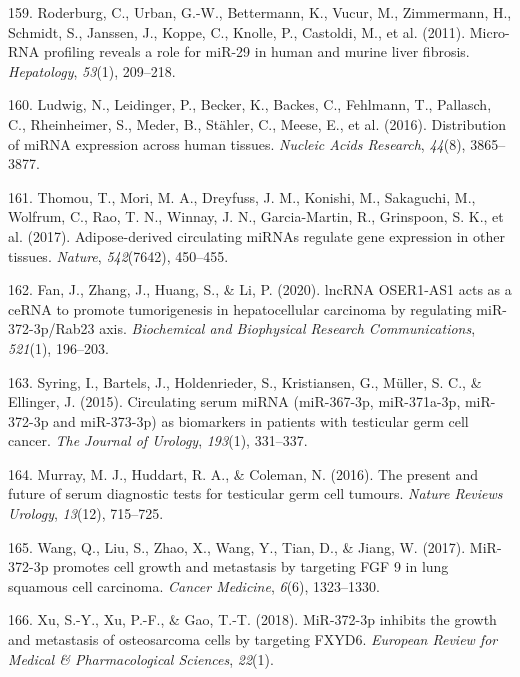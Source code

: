 \documentclass[
  11pt,
  letterpaper,
]{book}
\newlength{\cslhangindent}
\newenvironment{CSLReferences}[2] %
 {\begin{list}{}{%
  \setlength{\itemindent}{0pt}
  \setlength{\leftmargin}{0pt}
  \setlength{\parsep}{0pt}
  \ifodd #1
   \setlength{\leftmargin}{\cslhangindent}
   \setlength{\itemindent}{-1\cslhangindent}
  \fi
  \setlength{\itemsep}{#2\baselineskip}}}
 {\end{list}}
\begin{document}
\begin{CSLReferences}{1}{0}
159. Roderburg, C., Urban, G.-W., Bettermann, K., Vucur, M., Zimmermann,
H., Schmidt, S., Janssen, J., Koppe, C., Knolle, P., Castoldi, M., et
al. (2011). Micro-RNA profiling reveals a role for miR-29 in human and
murine liver fibrosis. \emph{Hepatology}, \emph{53}(1), 209--218.

160. Ludwig, N., Leidinger, P., Becker, K., Backes, C., Fehlmann, T.,
Pallasch, C., Rheinheimer, S., Meder, B., Stähler, C., Meese, E., et al.
(2016). Distribution of miRNA expression across human tissues.
\emph{Nucleic Acids Research}, \emph{44}(8), 3865--3877.

161. Thomou, T., Mori, M. A., Dreyfuss, J. M., Konishi, M., Sakaguchi,
M., Wolfrum, C., Rao, T. N., Winnay, J. N., Garcia-Martin, R.,
Grinspoon, S. K., et al. (2017). Adipose-derived circulating miRNAs
regulate gene expression in other tissues. \emph{Nature},
\emph{542}(7642), 450--455.

162. Fan, J., Zhang, J., Huang, S., \& Li, P. (2020). lncRNA OSER1-AS1
acts as a ceRNA to promote tumorigenesis in hepatocellular carcinoma by
regulating miR-372-3p/Rab23 axis. \emph{Biochemical and Biophysical
Research Communications}, \emph{521}(1), 196--203.

163. Syring, I., Bartels, J., Holdenrieder, S., Kristiansen, G., Müller,
S. C., \& Ellinger, J. (2015). Circulating serum miRNA (miR-367-3p,
miR-371a-3p, miR-372-3p and miR-373-3p) as biomarkers in patients with
testicular germ cell cancer. \emph{The Journal of Urology},
\emph{193}(1), 331--337.

164. Murray, M. J., Huddart, R. A., \& Coleman, N. (2016). The present
and future of serum diagnostic tests for testicular germ cell tumours.
\emph{Nature Reviews Urology}, \emph{13}(12), 715--725.

165. Wang, Q., Liu, S., Zhao, X., Wang, Y., Tian, D., \& Jiang, W.
(2017). MiR-372-3p promotes cell growth and metastasis by targeting FGF
9 in lung squamous cell carcinoma. \emph{Cancer Medicine}, \emph{6}(6),
1323--1330.

166. Xu, S.-Y., Xu, P.-F., \& Gao, T.-T. (2018). MiR-372-3p inhibits the
growth and metastasis of osteosarcoma cells by targeting FXYD6.
\emph{European Review for Medical \& Pharmacological Sciences},
\emph{22}(1).


\end{CSLReferences}
\end{document}
